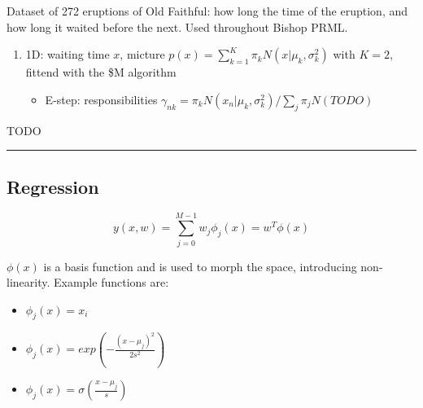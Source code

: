 \documentclass{article}
\begin{document}
Dataset of 272 eruptions of Old Faithful: how long the time of the
eruption, and how long it waited before the next. Used throughout Bishop
PRML.

\begin{enumerate}
\def\labelenumi{\arabic{enumi}.}
\item
  1D: waiting time \(x\), micture
  \(p(x) = \sum_{k=1}^K \pi_k N(x | \mu_k,
  \sigma_k^2)\) with \(K=2\), fittend with the \$M algorithm

  \begin{itemize}
  \tightlist
  \item
    E-step: responsibilities
    \(\gamma_{nk} = \pi_k N(x_n | \mu_k, \sigma_k^2) /
    \sum_j \pi_j N(TODO)\)
  \end{itemize}
\end{enumerate}

TODO

\begin{center}\rule{0.5\linewidth}{0.5pt}\end{center}

\subsection{Regression}\label{regression}

\[y(x, w) = \sum_{j=0}^{M-1} w_j \phi_j (x) = w^T \phi(x)\]

\(\phi(x)\) is a basis function and is used to morph the space,
introducing non-linearity. Example functions are:

\begin{itemize}
\item
  \(\phi_j (x) = x_i\)
\item
  \(\phi_j (x) = exp(- \frac{(x - \mu_j)^2}{2 s^2})\)
\item
  \(\phi_j (x) = \sigma (\frac{x - \mu_j}{s})\)
\end{itemize}
\end{document}
